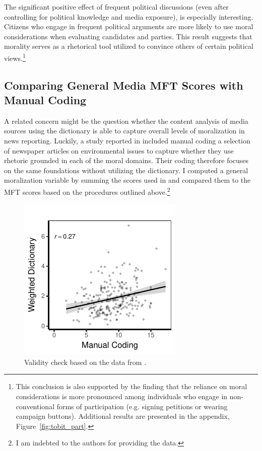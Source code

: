 \documentclass[12pt]{article}
\begin{document}
The significant positive effect of frequent political discussions (even after controlling for political knowledge and media exposure), is especially interesting. Citizens who engage in frequent political arguments are more likely to use moral considerations when evaluating candidates and parties. This result suggests that morality serves as a rhetorical tool utilized to convince others of certain political views.\footnote{This conclusion is also supported by the finding that the reliance on moral considerations is more pronounced among individuals who engage in non-conventional forms of participation (e.g. signing petitions or wearing campaign buttons). Additional results are presented in the appendix, Figure~\ref{fig:tobit_part}.}


\subsection{Comparing General Media MFT Scores with Manual Coding}

A related concern might be the question whether the content analysis of media sources using the dictionary is able to capture overall levels of moralization in news reporting. Luckily, a study reported in \citet{feinberg2013moral} included manual coding a selection of newspaper articles on environmental issues to capture whether they use rhetoric grounded in each of the moral domains. Their coding therefore focuses on the same foundations without utilizing the dictionary. I computed a general moralization variable by summing the scores used in \citet{feinberg2013moral} and compared them to the MFT scores based on the procedures outlined above.\footnote{I am indebted to the authors for providing the data.}

\begin{figure}[ht]\centering
\includegraphics{../calc/fig/feinberg_general.pdf}
\caption{Validity check based on the data from \citet{feinberg2013moral}.}\label{fig:ols_feinberg}
\end{figure}
\end{document}
